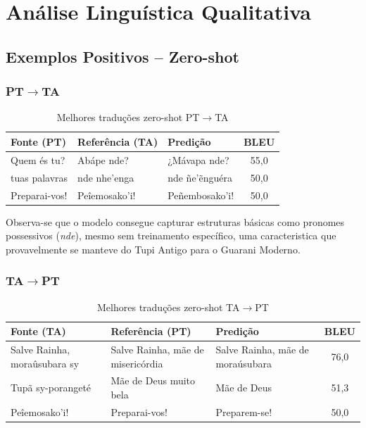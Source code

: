\documentclass[12pt,a4paper]{article}
\begin{document}
\section{Análise Linguística Qualitativa}

\subsection{Exemplos Positivos -- Zero-shot}

\subsubsection{PT$\rightarrow$TA}

\begin{table}[H]
\centering
\small
\begin{tabular}{p{3cm}p{4cm}p{4cm}c}
\toprule
\textbf{Fonte (PT)} & \textbf{Referência (TA)} & \textbf{Predição} & \textbf{BLEU} \\
\midrule
Quem és tu? & Abápe nde? & ¿Mávapa nde? & 55,0 \\
tuas palavras & nde nhe'enga & nde ñe'ẽnguéra & 50,0 \\
Preparai-vos! & Peîemosako'i! & Peñembosako'i! & 50,0 \\
\bottomrule
\end{tabular}
\caption{Melhores traduções zero-shot PT$\rightarrow$TA}
\end{table}

Observa-se que o modelo consegue capturar estruturas básicas como pronomes possessivos (\textit{nde}), mesmo sem treinamento específico, uma caracteristica que provavelmente se manteve do Tupi Antigo para o Guarani Moderno.

\subsubsection{TA$\rightarrow$PT}

\begin{table}[H]
\centering
\small
\begin{tabular}{p{4cm}p{4cm}p{4cm}c}
\toprule
\textbf{Fonte (TA)} & \textbf{Referência (PT)} & \textbf{Predição} & \textbf{BLEU} \\
\midrule
Salve Rainha, moraûsubara sy & Salve Rainha, mãe de misericórdia & Salve Rainha, mãe de moraúsubara & 76,0 \\
Tupã sy-porangeté & Mãe de Deus muito bela & Mãe de Deus & 51,3 \\
Peîemosako'i! & Preparai-vos! & Preparem-se! & 50,0 \\
\bottomrule
\end{tabular}
\caption{Melhores traduções zero-shot TA$\rightarrow$PT}
\end{table}
\end{document}
